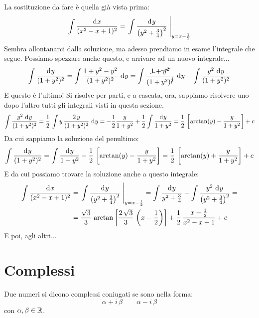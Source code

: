La sostituzione da fare \`e quella gi\`a vista prima:
\[
\int \frac{\diff x}{(x^2 - x + 1)^2} =
\substitute{\int \frac{\diff y}{{\left(y^2 + \frac{3}{4}\right)}^2}}{y = x - \frac{1}{2}}
\]
Sembra allontanarci dalla soluzione, ma adesso prendiamo in esame l'integrale che segue. Possiamo spezzare anche questo, e arrivare ad un nuovo integrale...
\[
\int \frac{\diff y}{(1 + y^2)^2} =
\int \frac{1 + y^2 - y^2}{(1 + y^2)^2} \dx[y] =
\int \frac{\cancel{1 + y^2}}{(1 + y^2)^{\cancel{2}}} \dx[y] -
\int \frac{y^2 \dx[y]}{(1 + y^2)^2}
\]
E questo \`e l'ultimo! Si risolve per parti, e a cascata, ora, sappiamo risolvere uno dopo l'altro tutti gli integrali visti in questa sezione.
\[
\int \frac{y^2 \dx[y]}{(1 + y^2)^2} = 
\frac{1}{2} \, \int y \, \frac{2 \, y}{(1 + y^2)^2} \dx[y] =
- \frac{1}{2} \frac{y}{1 + y^2} + \frac{1}{2} \int \frac{\diff y}{1 + y^2} = 
\frac{1}{2} \, \left[ \arctan(y) - \frac{y}{1 + y^2} \right] + c
\]
Da cui sappiamo la soluzione del penultimo:
\[
\int \frac{\diff y}{(1 + y^2)^2} =
\int \frac{\diff y}{1 + y^2} - \frac{1}{2} \, \left[ \arctan(y) - \frac{y}{1 + y^2} \right] =
\frac{1}{2} \, \left[ \arctan(y) + \frac{y}{1 + y^2} \right] + c
\]
E da cui possiamo trovare la soluzione anche a questo integrale:
\begin{align*}
\int \frac{\diff x}{(x^2 - x + 1)^2} &=
\substitute{\int \frac{\diff y}{{\left(y^2 + \frac{3}{4}\right)}^2}}{y = x - \frac{1}{2}} = \int \frac{\diff y}{y^2 + \frac{3}{4}} -
\int \frac{y^2 \dx[y]}{{\left(y^2 + \frac{3}{4}\right)}^2} = \\
&= \frac{\sqrt{3}}{3} \, \arctan \left[ \frac{2 \, \sqrt{3}}{3} \, \left( x - \frac{1}{2} \right) \right] +
\frac{1}{2} \, \frac{x - \frac{1}{2}}{x^2 - x + 1} + c
\end{align*}
E poi, agli altri...

\section{Complessi}

\begin{defn}
Due numeri si dicono complessi coniugati se sono nella forma:
\[
\alpha + i \, \beta \qquad \alpha - i \, \beta
\]
con $\alpha, \beta \in \mathbb{R}$.
\end{defn}

